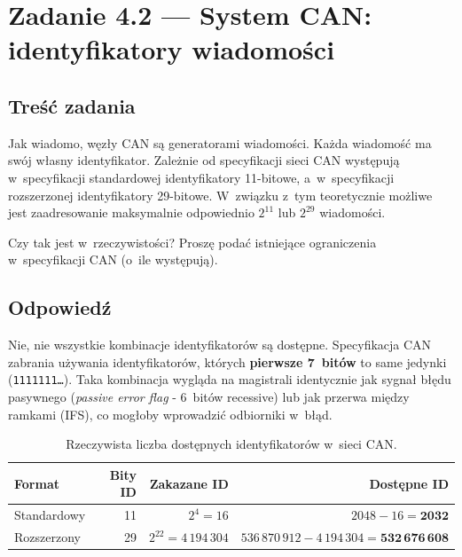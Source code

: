 \documentclass[12pt,a4paper]{article}
\begin{document}
\section*{Zadanie 4.2 — System CAN: identyfikatory wiadomości}

\subsection*{Treść zadania}

Jak wiadomo, węzły CAN są generatorami wiadomości. Każda wiadomość ma swój
własny identyfikator. Zależnie od specyfikacji sieci CAN występują w~specyfikacji
standardowej identyfikatory 11-bitowe, a~w~specyfikacji rozszerzonej identyfikatory
29-bitowe. W~związku z~tym teoretycznie możliwe jest zaadresowanie maksymalnie
odpowiednio $2^{11}$ lub $2^{29}$ wiadomości.

Czy tak jest w~rzeczywistości? Proszę podać istniejące ograniczenia w~specyfikacji
CAN (o~ile występują).

\subsection*{Odpowiedź}

Nie, nie wszystkie kombinacje identyfikatorów są dostępne. Specyfikacja CAN zabrania
używania identyfikatorów, których \textbf{pierwsze 7~bitów} to same jedynki
(\texttt{1111111\dots}). Taka kombinacja wygląda na magistrali identycznie jak sygnał
błędu pasywnego (\textit{passive error flag} - 6~bitów recessive) lub jak przerwa
między ramkami (IFS), co mogłoby wprowadzić odbiorniki w~błąd.

\begin{table}[H]
\centering
\begin{tabular}{lrrr}
\toprule
\textbf{Format} & \textbf{Bity ID} & \textbf{Zakazane ID} & \textbf{Dostępne ID} \\
\midrule
Standardowy & 11 & $2^{4} = 16$ & $2048 - 16 = \mathbf{2032}$ \\
Rozszerzony & 29 & $2^{22} = 4\,194\,304$ &
    $536\,870\,912 - 4\,194\,304 = \mathbf{532\,676\,608}$ \\
\bottomrule
\end{tabular}
\caption{Rzeczywista liczba dostępnych identyfikatorów w~sieci CAN.}
\end{table}
\end{document}
